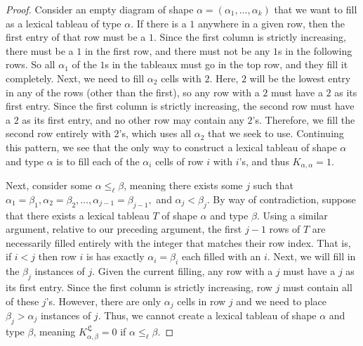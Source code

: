 \documentclass{amsart}
\theoremstyle{definition}
\newcommand{\lx}{\mathfrak{L}}
\begin{document}
\begin{proof}
 Consider an empty diagram of shape $\alpha = (\alpha_1, \ldots, \alpha_k)$ that we want to fill as a lexical tableau of type $\alpha$. If 
 there is a $1$ anywhere in a given row, then the first entry of that row must be a $1$. Since the first column is strictly increasing, there
 must be a $1$ in the first row, and there must not be any $1$s in the following rows. So all $\alpha_1$ of the $1$s in the tableaux must 
 go in the top row, and they fill it completely. Next, we need to fill $\alpha_2$ cells with $2$. Here, $2$ will be the lowest entry in any of 
 the rows (other than the first), so any row with a $2$ must have a $2$ as its first entry. Since the first column is strictly increasing, 
 the second row must have a $2$ as its first entry, and no other row may contain any $2$'s. Therefore, we fill the second row entirely 
 with $2$'s, which uses all $\alpha_2$ that we seek to use. Continuing this pattern, we see that the only way to construct a lexical tableau 
 of shape $\alpha$ and type $\alpha$ is to fill each of the $\alpha_i$ cells of row $i$ with $i$'s, and thus  $K_{\alpha,\alpha} = 1$. 
 
 Next, consider some $\alpha \leq_{\ell} \beta$, meaning there exists some $j$ such that $\alpha_1 = \beta_1, \alpha_2 = \beta_2, \ldots, 
 \alpha_{j-1}=\beta_{j-1},$ and $\alpha_j<\beta_j$. By way of contradiction, suppose that there exists a lexical tableau $T$ of shape $\alpha$ and type $\beta$. Using a similar argument, relative to our preceding argument, the first $j-1$ rows of $T$ are necessarily filled entirely with the integer that matches their row index. That is, if $i < j$ then row 
 $i$ is has exactly $\alpha_i = \beta_i$ each filled with an $i$. Next, we will fill in the $\beta_j$ instances of $j$. Given the current filling, 
 any row with a $j$ must have a $j$ as its first entry. Since the first column is strictly increasing, row $j$ must contain all of these $j$'s. 
 However, there are only $\alpha_j$ cells in row $j$ and we need to place $\beta_j > \alpha_j$ instances of $j$. Thus, we cannot create a 
 lexical tableau of shape $\alpha$ and type $\beta$, meaning $K^{\lx}_{\alpha, \beta}=0$ if $\alpha \leq_{\ell} \beta$. 
\end{proof}
\end{document}
